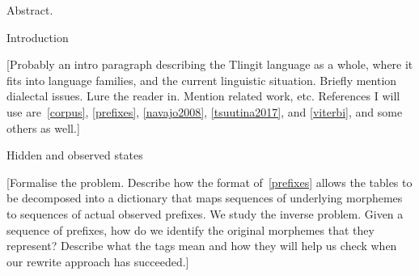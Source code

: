 


\def\Q#1{Q({\tt #1})}
\def\R#1{R({\tt #1})}
\def\A#1{A({\tt #1})}
\def\M#1{M({\tt #1})}
\def\S#1{S({\tt #1})}
\def\D#1{D({\tt #1})}
\def\F#1{F({\tt #1})}
\def\I#1{I({\tt #1})}
\def\E#1{E({\tt #1})}
\def\g{\underline{g}}
\def\x{\underline{x}}

\newcount\listcount
\def\resetnum{\global\listcount=1}
\def\numitem{\item{\romannumeral\listcount)}\global\advance\listcount by 1}


 \ninebf Abstract. 

\advsect Introduction

[Probably an intro paragraph describing the Tlingit language
as a whole, where it fits into language families, and the current linguistic situation. Briefly mention dialectal
issues. Lure the reader in.
Mention related work, etc. References I will use are~\ref{corpus},
\ref{prefixes}, \ref{navajo2008}, \ref{tsuutina2017}, and \ref{viterbi}, and some others as well.]

\advsect Hidden and observed states

[Formalise the problem. Describe how the format of~\ref{prefixes} allows the tables to be decomposed
into a dictionary that maps
sequences of underlying morphemes to sequences of actual observed prefixes. We study the inverse problem.
Given a sequence of prefixes, how do we identify the original morphemes that they represent?
Describe what the tags mean and how
they will help us check when our rewrite approach has succeeded.]


